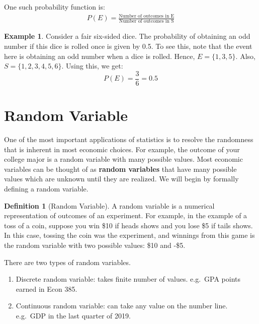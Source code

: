 \documentclass[
]{book}
\theoremstyle{definition}
\newtheorem{definition}{Definition}[chapter]
\theoremstyle{definition}
\newtheorem{example}{Example}[chapter]
\theoremstyle{definition}
\theoremstyle{definition}
\theoremstyle{remark}
\begin{document}
One such probability function is:
\begin{align}
P(E) = \frac{\text{Number of  outcomes  in  E}}{\text{Number  of  outcomes  in  S}}
\end{align}

\begin{example}
\protect\hypertarget{exm:unnamed-chunk-70}{}\label{exm:unnamed-chunk-70}Consider a fair six-sided dice. The probability of obtaining an odd number if this dice is rolled once is given by 0.5. To see this, note that the event here is obtaining an odd number when a dice is rolled. Hence, \(E=\{1,3,5\}\). Also, \(S=\{1,2,3,4,5,6\}\). Using this, we get:
\begin{equation}
P(E)=\frac{3}{6}=0.5
\end{equation}
\end{example}

\hypertarget{random-variable}{%
\section{Random Variable}\label{random-variable}}

One of the most important applications of statistics is to resolve the randomness that is inherent in most economic choices. For example, the outcome of your college major is a random variable with many possible values. Most economic variables can be thought of as \textbf{random variables} that have many possible values which are unknown until they are realized. We will begin by formally defining a random variable.

\begin{definition}[Random Variable]
\protect\hypertarget{def:unnamed-chunk-71}{}\label{def:unnamed-chunk-71}A random variable is a numerical representation of outcomes of an experiment. For example, in the example of a toss of a coin, suppose you win \$10 if heads shows and you lose \$5 if tails shows. In this case, tossing the coin was the experiment, and winnings from this game is the random variable with two possible values: \$10 and -\$5.
\end{definition}

There are two types of random variables.

\begin{enumerate}
\def\labelenumi{\arabic{enumi}.}
\item
  Discrete random variable: takes finite number of values. e.g.~GPA points earned in Econ 385.
\item
  Continuous random variable: can take any value on the number line. e.g.~GDP in the last quarter of 2019.
\end{enumerate}
\end{document}
